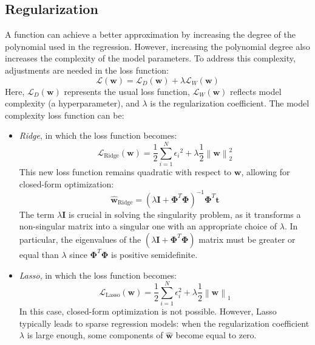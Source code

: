 \subsection{Regularization}
A function can achieve a better approximation by increasing the degree of the polynomial used in the regression.
However, increasing the polynomial degree also increases the complexity of the model parameters.
To address this complexity, adjustments are needed in the loss function:
\[\mathcal{L}(\mathbf{w})=\mathcal{L}_D(\mathbf{w})+\lambda \mathcal{L}_W(\mathbf{w})\]
Here, $\mathcal{L}_D(\mathbf{w})$ represents the usual loss function, $\mathcal{L}_W(\mathbf{w})$ reflects model complexity (a hyperparameter), and $\lambda$ is the regularization coefficient.
The model complexity loss function can be: 
\begin{itemize}
    \item \textit{Ridge}, in which the loss function becomes: 
        \[\mathcal{L}_{\text{Ridge}}(\mathbf{w})=\dfrac{1}{2}\sum_{i=1}^N {\epsilon_i}^2 + \lambda\dfrac{1}{2}{\left\lVert \mathbf{w} \right\rVert}_2^2\]
        This new loss function remains quadratic with respect to $\mathbf{w}$, allowing for closed-form optimization:
        \[\hat{\mathbf{w}}_{\text{Ridge}}={\left( \lambda\mathbf{I}+\boldsymbol{\Phi}^T \boldsymbol{\Phi} \right)}^{-1}\boldsymbol{\Phi}^T\mathbf{t}\]
        The term $\lambda\mathbf{I}$ is crucial in solving the singularity problem, as it transforms a non-singular matrix into a singular one with an appropriate choice of $\lambda$.
        In particular, the eigenvalues of the $\left( \lambda\mathbf{I}+\boldsymbol{\Phi}^T \boldsymbol{\Phi} \right)$ matrix must be greater or equal than $\lambda$ since $\boldsymbol{\Phi}^T \boldsymbol{\Phi}$ is positive semidefinite. 
    \item \textit{Lasso}, in which the loss function becomes: 
        \[\mathcal{L}_{\text{Lasso}}(\mathbf{w})=\dfrac{1}{2}\sum_{i=1}^N \epsilon_i^2 + \lambda\dfrac{1}{2}{\left\lVert \mathbf{w} \right\rVert}_1\]
        In this case, closed-form optimization is not possible. 
        However, Lasso typically leads to sparse regression models: when the regularization coefficient $\lambda$ is large enough, some components of $\hat{\mathbf{w}}$ become equal to zero.
\end{itemize}

